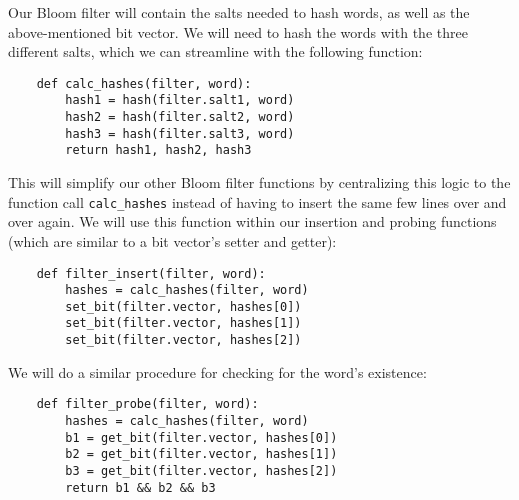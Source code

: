 \documentclass[12pt]{article}
\begin{document}
Our Bloom filter will contain the salts needed to hash words, as well as the above-mentioned bit vector. We will need to hash the words with the three different salts, which we can streamline with the following function:
\begin{verbatim}
    def calc_hashes(filter, word):
        hash1 = hash(filter.salt1, word)
        hash2 = hash(filter.salt2, word)
        hash3 = hash(filter.salt3, word)
        return hash1, hash2, hash3
\end{verbatim}
This will simplify our other Bloom filter functions by centralizing this logic to the function call \verb|calc_hashes| instead of having to insert the same few lines over and over again. We will use this function within our insertion and probing functions (which are similar to a bit vector's setter and getter):
\begin{verbatim}
    def filter_insert(filter, word):
        hashes = calc_hashes(filter, word)
        set_bit(filter.vector, hashes[0])
        set_bit(filter.vector, hashes[1])
        set_bit(filter.vector, hashes[2])
\end{verbatim}
We will do a similar procedure for checking for the word's existence:
\begin{verbatim}
    def filter_probe(filter, word):
        hashes = calc_hashes(filter, word)
        b1 = get_bit(filter.vector, hashes[0])
        b2 = get_bit(filter.vector, hashes[1])
        b3 = get_bit(filter.vector, hashes[2])
        return b1 && b2 && b3
\end{verbatim}
\end{document}
